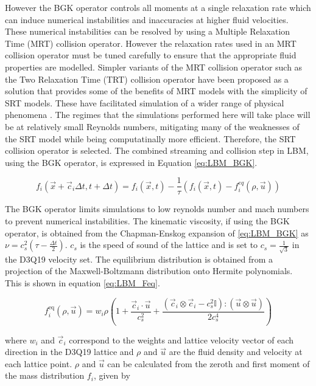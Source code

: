 However the BGK operator controls all moments at a single relaxation rate which can induce numerical instabilities and inaccuracies
at higher fluid velocities. \cite{liu_simulation_2023, adhikari_fluctuating_2005} These numerical instabilities can be resolved by using
a Multiple Relaxation Time (MRT) collision operator. However the relaxation rates used in an MRT collision operator must be tuned carefully
to ensure that the appropriate fluid properties are modelled. Simpler variants of the MRT collision operator such as the Two Relaxation Time (TRT)
collision operator have been proposed as a solution that provides some of the benefits of MRT models with the simplicity of SRT models. These 
have facilitated simulation of a wider range of physical phenomena \cite{adhikari_fluctuating_2005, liu_simulation_2023}. The regimes that the simulations 
performed here will take place will be at relatively small Reynolds numbers, mitigating many of the weaknesses of the SRT model while being computatinally
more efficient. Therefore, the SRT collision operator is selected. The combined streaming and 
collision step in LBM, using the BGK operator, is expressed in Equation \ref{eq:LBM_BGK}.

\begin{equation}
    f_{i}(\vec{x} + \vec{c}_{i}\Delta t, t + \Delta t) = f_{i}(\vec{x}, t) - \frac{1}{\tau}(f_{i}(\vec{x}, t) 
    - f_{i}^{eq}(\rho, \vec{u}))
    \label{eq:LBM_BGK}
\end{equation}

The BGK operator limits simulations to low reynolds number and mach numbers to prevent numerical instabilities. 
\cite{qian_lattice_1992} The kinematic viscosity, if using the BGK operator, is obtained from the Chapman-Enskog expansion of \ref{eq:LBM_BGK}
as $\nu = c_s^2(\tau - \frac{\Delta t}{2})$. $c_s$ is the speed of sound of the lattice and is set to $c_s = \frac{1}{\sqrt{3}}$ in the D3Q19 velocity set. 
The equilibrium distribution is obtained from a projection of the 
Maxwell-Boltzmann distribution onto Hermite polynomials. \cite{he_theory_1997, succi_lattice_2018} This is shown in equation 
\ref{eq:LBM_Feq}.

\begin{equation}
    f_i^{\text{eq}}(\rho, \vec{u}) = w_i \rho \left( 1 + \frac{\vec{c}_i \cdot \vec{u}}{c_s^2} + \frac{(\vec{c}_i \otimes \vec{c}_i - c_s^2 \mathbb{I}) : (\vec{u} \otimes \vec{u})}{2c_s^4} \right)
    \label{eq:LBM_Feq}
\end{equation}

where $w_i$ and $\vec{c}_i$ correspond to the weights and lattice velocity vector of each direction in the D3Q19 lattice and $\rho$ and $\vec{u}$ are the fluid density
and velocity at each lattice point. $\rho$ and $\vec{u}$ can be calculated from the zeroth and first moment of the mass distribution $f_i$, given by 

